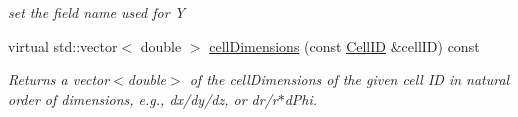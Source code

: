 \begin{DoxyCompactItemize}
\begin{DoxyCompactList}\small\item\em set the field name used for Y \item\end{DoxyCompactList}\item 
virtual std::vector$<$ double $>$ \hyperlink{class_d_d4hep_1_1_d_d_segmentation_1_1_cartesian_grid_x_z_a83908aef5a6fff44c188ce6515a88856}{cellDimensions} (const \hyperlink{namespace_d_d4hep_1_1_d_d_segmentation_ac7af071d85cb48820914434a07e21ba1}{CellID} \&cellID) const 
\begin{DoxyCompactList}\small\item\em Returns a vector$<$double$>$ of the cellDimensions of the given cell ID in natural order of dimensions, e.g., dx/dy/dz, or dr/r$\ast$dPhi. \item\end{DoxyCompactList}\end{DoxyCompactItemize}
